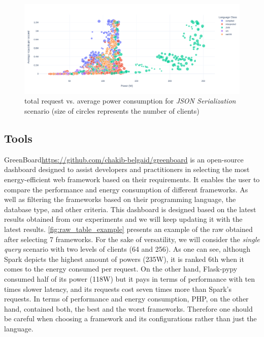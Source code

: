 \begin{figure}[!h]
    \centering
    \includegraphics[width=\textwidth,height=\textheight,keepaspectratio]{imgs/power_requests_json}
    \caption{total request vs. average power consumption for \emph{JSON Serialization} scenario (size of circles represents the number of clients)}
    \label{fig:power_requests_json}
\end{figure}

\subsection{Tools}\label{sec:tools}
\textsf{GreenBoard}\url{https://github.com/chakib-belgaid/greenboard} is an open-source dashboard designed to assist developers and practitioners in selecting the most energy-efficient web framework based on their requirements.
It enables the user to compare the performance and energy consumption of different frameworks. As well as filtering the frameworks based on their programming language, the database type, and other criteria.
This dashboard is designed based on the latest results obtained from our experiments and we will keep updating it with the latest results.
\cref*{fig:raw_table_example} presents an example of the raw obtained after selecting 7 frameworks. For the sake of versatility, we will consider the \emph{single query} scenario with two levels of clients (64 and 256).
As one can see, although \textsf{Spark} depicts the highest amount of powers (235W), it is ranked 6th when it comes to the energy consumed per request. On the other hand, \textsf{Flask-pypy} consumed half of its power (118W) but it pays in terms of performance with ten times slower latency, and its requests cost seven times more than \textsf{Spark's} requests.
In terms of performance and energy consumption, PHP, on the other hand, contained both, the best and the worst frameworks. Therefore one should be careful when choosing a framework and its configurations rather than just the language.

